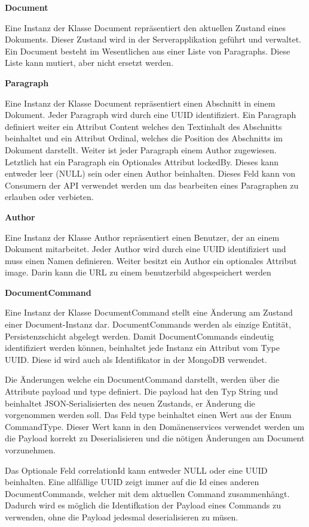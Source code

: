 \textbf{Document}

Eine Instanz der Klasse Document repräsentiert den aktuellen Zustand eines Dokuments.
Dieser Zustand wird in der Serverapplikation geführt und verwaltet.
Ein Document besteht im Wesentlichen aus einer Liste von Paragraphs.
Diese Liste kann mutiert, aber nicht ersetzt werden.

\textbf{Paragraph}

Eine Instanz der Klasse Document repräsentiert einen Abschnitt in einem Dokument.
Jeder Paragraph wird durch eine UUID identifiziert.
Ein Paragraph definiert weiter ein Attribut Content welches den Textinhalt des Abschnitts beinhaltet und ein Attribut Ordinal, welches die Position des Abschnitts im Dokument darstellt.
Weiter ist jeder Paragraph einem Author zugewiesen.
Letztlich hat ein Paragraph ein Optionales Attribut lockedBy.
Dieses kann entweder leer (NULL) sein oder einen Author beinhalten.
Dieses Feld kann von Consumern der API verwendet werden um das bearbeiten eines Paragraphen zu erlauben oder verbieten.

\textbf{Author}

Eine Instanz der Klasse Author repräsentiert einen Benutzer, der an einem Dokument mitarbeitet.
Jeder Author wird durch eine UUID identifiziert und muss einen Namen definieren.
Weiter besitzt ein Author ein optionales Attribut image.
Darin kann die URL zu einem benutzerbild abgespeichert werden

\clearpage

\textbf{DocumentCommand}

Eine Instanz der Klasse DocumentCommand stellt eine Änderung am Zustand einer Document-Instanz dar.
DocumentCommands werden als einzige Entität, Persistenzschicht abgelegt werden.
Damit DocumentCommands eindeutig identifiziert werden können, beinhaltet jede Instanz ein Attribut vom Type UUID.
Diese id wird auch als Identifikator in der MongoDB verwendet.

Die Änderungen welche ein DocumentCommand darstellt, werden über die Attribute payload und type definiert.
Die payload hat den Typ String und beinhaltet JSON-Serialisierten des neuen Zustands, er Änderung die vorgenommen werden soll.
Das Feld type beinhaltet einen Wert aus der Enum CommandType.
Dieser Wert kann in den Domänenservices verwendet werden um die Payload korrekt zu Deserialisieren und die nötigen Änderungen am Document vorzunehmen.

Das Optionale Feld correlationId kann entweder NULL oder eine UUID beinhalten.
Eine allfällige UUID zeigt immer auf die Id eines anderen DocumentCommands, welcher mit dem aktuellen Command zusammenhängt.
Dadurch wird es möglich die Identifkation der Payload eines Commands zu verwenden, ohne die Payload jedesmal deserialisieren zu müsen.

